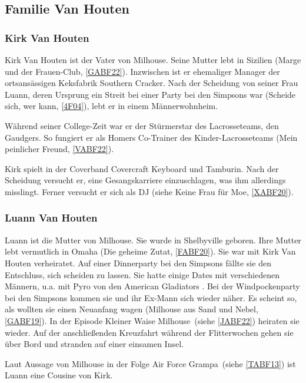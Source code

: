 {\subsection{Familie Van Houten}
 
\subsubsection{Kirk Van Houten}\label{KirkVanHouten}
Kirk Van Houten ist der Vater von Milhouse. Seine Mutter lebt in Sizilien (\glqq Marge und der Frauen-Club\grqq , \ref{GABF22}). Inzwischen ist er ehemaliger Manager der ortsansässigen Keksfabrik \glqq Southern Cracker\grqq . Nach der Scheidung von seiner Frau Luann, deren Ursprung ein Streit bei einer Party bei den Simpsons war (\glqq Scheide sich, wer kann\grqq , \ref{4F04}), lebt er in einem Männer\-wohn\-heim.

Während seiner College-Zeit war er der Stürmerstar des Lacrosseteams, den \glqq Gaudgers\grqq. So fungiert er als Homers Co-Trainer des Kinder-Lacrosseteams (\glqq Mein peinlicher Freund\grqq , \ref{VABF22}).

Kirk spielt in der Coverband Covercraft Keyboard und Tamburin. Nach der Scheidung versucht er, eine Gesangskarriere einzuschlagen, was ihm allerdings misslingt. Ferner versucht er sich als DJ (siehe \glqq Keine Frau für Moe\grqq, \ref{XABF20}).

\subsubsection{Luann Van Houten}\label{LuannVanHouten}
Luann ist die Mutter von Milhouse. Sie wurde in Shelbyville geboren. Ihre Mutter lebt vermutlich in Omaha (\glqq Die geheime Zutat\grqq , \ref{FABF20}). Sie war mit Kirk Van Houten verheiratet. Auf einer Dinnerparty bei den Simpsons fällte sie den Entschluss, sich scheiden zu lassen. Sie hatte einige Dates mit verschiedenen Männern, u.a. mit Pyro von den American Gladiators \cite{SpringfieldAt}. Bei der Windpockenparty bei den Simpsons kommen sie und ihr Ex-Mann sich wieder näher. Es scheint so, als wollten sie einen Neuanfang wagen (\glqq Milhouse aus Sand und Nebel\grqq , \ref{GABF19}). In der Episode \glqq Kleiner Waise Milhouse\grqq\ (siehe \ref{JABF22}) heiraten sie wieder. Auf der anschließenden Kreuzfahrt während der Flitterwochen gehen sie über Bord und stranden auf einer einsamen Insel.

Laut Aussage von Milhouse in der Folge \glqq Air Force Grampa\grqq\ (siehe \ref{TABF13}) ist Luann eine Cousine von Kirk.

}
